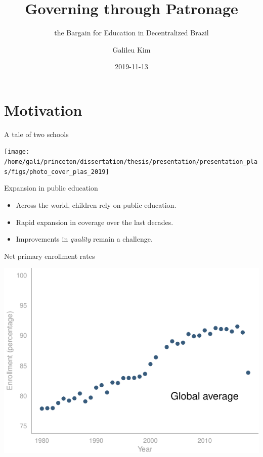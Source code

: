 \documentclass[
  ignorenonframetext,
]{beamer}
\title{Governing through Patronage}
\subtitle{the Bargain for Education in Decentralized Brazil}
\author{Galileu Kim}
\date{2019-11-13}
\providecommand{\tightlist}{%
  \setlength{\itemsep}{0pt}\setlength{\parskip}{0pt}}
\begin{document}
\frame{\titlepage}

\hypertarget{motivation}{%
\section{Motivation}\label{motivation}}

\begin{frame}{A tale of two schools}
\protect\hypertarget{a-tale-of-two-schools}{}

\begin{center}\texttt{[image: /home/gali/princeton/dissertation/thesis/presentation/presentation\_plas/figs/photo\_cover\_plas\_2019]} \end{center}

\end{frame}

\begin{frame}{Expansion in public education}
\protect\hypertarget{expansion-in-public-education}{}

\begin{itemize}
\tightlist
\item
  Across the world, children rely on public education.
\item
  Rapid expansion in coverage over the last decades.
\item
  Improvements in \emph{quality} remain a challenge.
\end{itemize}

\end{frame}

\begin{frame}{Net primary enrollment rates}
\protect\hypertarget{net-primary-enrollment-rates}{}

\begin{center}\includegraphics{presentation_plas_11-14-19_files/figure-beamer/unnamed-chunk-2-1} \end{center}

\end{frame}
\end{document}
